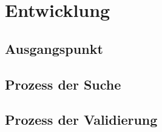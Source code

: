 \section{Entwicklung} %
\label{sec:entwicklung}

	\subsection{Ausgangspunkt}
	\label{sub:ausgangspunkt}
	

	\subsection{Prozess der Suche}
	\label{sub:prozess_der_suche}
	


	\subsection{Prozess der Validierung}
	\label{sub:prozess_der_validierung}
	

	

